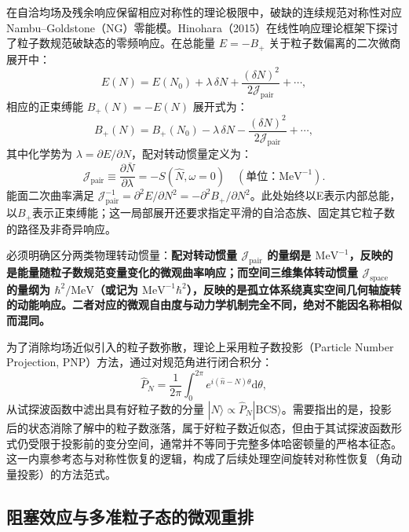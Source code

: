 在自洽均场及残余响应保留相应对称性的理论极限中，破缺的连续规范对称性对应 Nambu–Goldstone（NG）零能模。Hinohara（2015）在线性响应理论框架下探讨了粒子数规范破缺态的零频响应\cite{hinohara-2015-nambu-goldstone-inertia-response}。在总能量 $E = -B_+$ 关于粒子数偏离的二次微商展开中：
\begin{equation}\label{eq:2-3-28}
E(N) = E(N_0) + \lambda \, \delta N + \frac{(\delta N)^2}{2 \mathcal{J}_{\text{pair}}} + \cdots,
\end{equation}
相应的正束缚能 $B_+(N) = -E(N)$ 展开式为：
\begin{equation}\label{eq:2-3-29}
B_+(N) = B_+(N_0) - \lambda \, \delta N - \frac{(\delta N)^2}{2 \mathcal{J}_{\text{pair}}} + \cdots,
\end{equation}
其中化学势为 $\lambda = \partial E/\partial N$，配对转动惯量定义为：
\begin{equation}\label{eq:2-3-30}
\mathcal{J}_{\text{pair}} \equiv \frac{\partial \bar{N}}{\partial \lambda} = -S(\hat{N}, \omega = 0) \quad (\text{单位：}\text{MeV}^{-1}).
\end{equation}
能面二次曲率满足 $\mathcal{J}_{\text{pair}}^{-1} = \partial^2 E/\partial N^2 = -\partial^2 B_+/\partial N^2$。此处始终以E表示内部总能，以$B_+$表示正束缚能；这一局部展开还要求指定平滑的自洽态族、固定其它粒子数的路径及非奇异响应。

必须明确区分两类物理转动惯量：\textbf{配对转动惯量 $\mathcal{J}_{\text{pair}}$ 的量纲是 $\text{MeV}^{-1}$，反映的是能量随粒子数规范变量变化的微观曲率响应；而空间三维集体转动惯量 $\mathcal{J}_{\text{space}}$ 的量纲为 $\hbar^2/\text{MeV}$（或记为 $\text{MeV}^{-1}\hbar^2$），反映的是孤立体系绕真实空间几何轴旋转的动能响应。二者对应的微观自由度与动力学机制完全不同，绝对不能因名称相似而混同。}

为了消除均场近似引入的粒子数弥散，理论上采用粒子数投影（Particle Number Projection, PNP）方法，通过对规范角进行闭合积分：
\begin{equation}\label{eq:2-3-31}
\hat{P}_N = \frac{1}{2\pi} \int_0^{2\pi} e^{i (\hat{n} - N) \theta} \mathrm{d}\theta,
\end{equation}
从试探波函数中滤出具有好粒子数的分量 $|N\rangle \propto \hat{P}_N |\mathrm{BCS}\rangle$。需要指出的是，投影后的状态消除了解中的粒子数涨落，属于好粒子数近似态，但由于其试探波函数形式仍受限于投影前的变分空间，通常并不等同于完整多体哈密顿量的严格本征态。这一内禀参考态与对称性恢复的逻辑，构成了后续处理空间旋转对称性恢复（角动量投影）的方法范式。



\subsection{阻塞效应与多准粒子态的微观重排}\label{sec:2-3-4}


